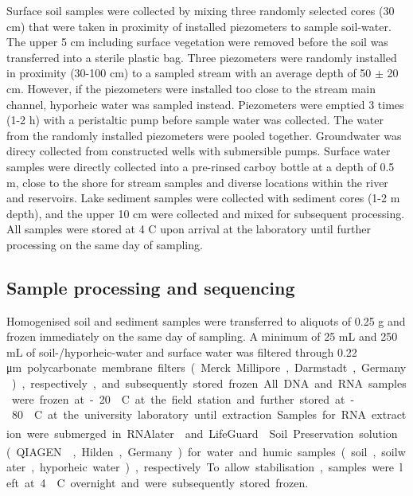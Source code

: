 \documentclass[12pt,a4paper]{article} %
\begin{document}
Surface soil samples were collected by mixing three randomly selected cores (30 cm) that were taken in proximity of installed piezometers to sample soil-water. The upper 5 cm including surface vegetation were removed before the soil was transferred into a sterile plastic bag. Three piezometers were randomly installed in proximity (30-100 cm) to a sampled stream with an average depth of 50 $\pm$ 20 cm. However, if the piezometers were installed too close to the stream main channel, hyporheic water was sampled instead. Piezometers were emptied 3 times (1-2 h) with a peristaltic pump before sample water was collected. The water from the randomly installed piezometers were pooled together. Groundwater was direcy collected from constructed wells with submersible pumps. Surface water samples were directly collected into a pre-rinsed carboy bottle at a depth of 0.5 m, close to the shore for stream samples and diverse locations within the river and reservoirs. Lake sediment samples were collected with sediment cores (1-2 m depth), and the upper 10 cm were collected and mixed for subsequent processing. All samples were stored at 4 \textdegree{}C upon arrival at the laboratory until further processing on the same day of sampling. 

\subsection*{Sample processing and sequencing}
Homogenised soil and sediment samples were transferred to aliquots of 0.25 g and frozen immediately on the same day of sampling. A minimum of 25 mL and 250 mL of soil-/hyporheic-water and surface water was filtered through 0.22 \si\micro m polycarbonate membrane filters (Merck Millipore, Darmstadt, Germany), respectively, and subsequently stored frozen. All DNA and RNA samples were frozen at -20 \textdegree{}C at the field station and further stored at -80 \textdegree{}C at the university laboratory until extraction. Samples for RNA extraction were submerged in RNAlater\textsuperscript{\textregistered} and LifeGuard\textsuperscript{\textregistered} Soil Preservation solution (QIAGEN\textsuperscript{\textregistered}, Hilden, Germany) for water and humic samples (soil, soilwater, hyporheic water), respectively. To allow stabilisation, samples were left at 4 \textdegree{}C overnight and were subsequently stored frozen.
\end{document}
